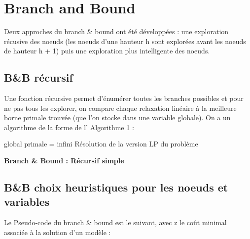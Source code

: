 \documentclass[a4paper,10pt]{article}
\begin{document}
\newpage
\section{Branch and Bound}
Deux approches du branch \& bound ont été développées : une exploration récusive des noeuds (les noeuds d'une hauteur h sont explorées avant les noeuds de hauteur h + 1) puis une exploration plus intelligente des noeuds.

\subsection{B\&B récursif}
Une fonction récursive permet d'énumérer toutes les branches possibles et pour ne pas tous les explorer, on compare chaque relaxation linéaire à la meilleure borne primale trouvée (que l'on stocke dans une variable globale). On a un algorithme de la forme de l' Algorithme 1 :


\begin{algorithm}[!h]
  \begin{small}
    global primale = infini\;
    \BlankLine\DontPrintSemicolon
    Résolution de la version LP du problème\;
  \end{small}
  \caption{\textbf{Branch \& Bound : Récursif simple}}
\end{algorithm}


\subsection{B\&B choix heuristiques pour les noeuds et variables}
Le Pseudo-code du branch \& bound est le suivant, avec z le coût minimal associée à la solution d'un modèle :
\end{document}
